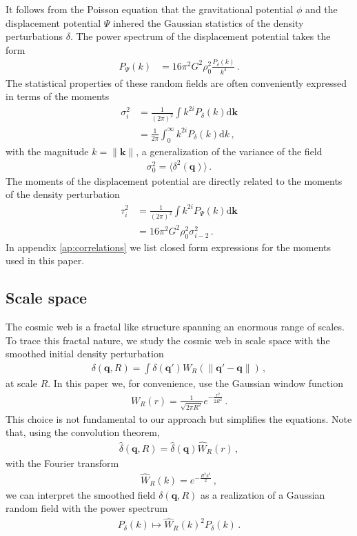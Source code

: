 \documentclass[a4paper, 11pt]{article}
\begin{document}
It follows from the Poisson equation that the gravitational potential $\phi$ and the displacement potential $\Psi$ inhered the Gaussian statistics of the density perturbations $\delta$. The power spectrum of the displacement potential takes the form 
\begin{align}
P_\Psi(k) &= 16 \pi^2 G^2 \rho_0^2 \frac{P_\delta(k)}{k^4}%
\,.
\end{align}
The statistical properties of these random fields are often conveniently expressed in terms of the moments
\begin{align}
\sigma_i^2 &= \frac{1}{(2\pi)^2} \int k^{2i}P_\delta(k)\mathrm{d}\bm{k}\nonumber\\
&= \frac{1}{2\pi} \int_0^\infty k^{2i}P_\delta(k)\mathrm{d}k\,,
\end{align}
with the magnitude $k = \|\bm{k}\|$, a generalization of the variance of the field
\begin{align}
\sigma_0^2 = \langle \delta^2(\bm{q}) \rangle\,.
\end{align} 
The moments of the displacement potential are directly related to the moments of the density perturbation
\begin{align}
\tau_i^2&=\frac{1}{(2\pi)^2} \int k^{2i}P_\Psi(k)\mathrm{d}\bm{k}\nonumber\\
&=16 \pi^2 G^2 \rho_0^2 \sigma_{i-2}^2\,.
\end{align}
In appendix \ref{ap:correlations} we list closed form expressions for the moments used in this paper.


\subsection{Scale space}
The cosmic web is a fractal like structure spanning an enormous range of scales. To trace this fractal nature, we study the cosmic web in scale space with the smoothed initial density perturbation
\begin{align}
\delta(\bm{q},R) = \int \delta(\bm{q}') W_R(\|\bm{q}' - \bm{q}\|)\,,
\end{align}
at scale $R$. In this paper we, for convenience, use the Gaussian window function
\begin{align}
W_R(r) = \frac{1}{\sqrt{2\pi R^2}}e^{-\frac{r^2}{2R^2}}\,.
\end{align}
This choice is not fundamental to our approach but simplifies the equations. Note that, using the convolution theorem, 
\begin{align}
\hat{\delta}(\bm{q},R) = \hat{\delta}(\bm{q})  \hat{W}_R(r)\,,
\end{align}
with the Fourier transform
\begin{align}
\hat{W}_R(k) = e^{-\frac{R^2 k^2}{2}}\,,
\end{align}
we can interpret the smoothed field $\delta(\bm{q},R)$ as a realization of a Gaussian random field with the power spectrum
\begin{align}
P_\delta(k) \mapsto \hat{W}_R(k)^2P_\delta(k)\,.
\end{align}
\end{document}
